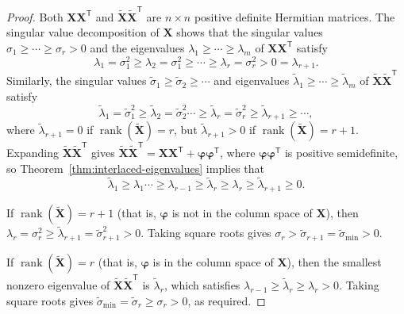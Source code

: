 \documentclass[10pt,a4paper]{amsart}
\DeclareMathOperator{\rank}{rank}
\newcommand{\bbX}{\mathbf{X}}
\newcommand{\bphi}{\boldsymbol{\varphi}}
\newcommand{\trp}{^{\mathsf{T}}}  %
\begin{document}
\begin{proof}
Both $\bbX \bbX\trp$ and $\widetilde{\bbX}\widetilde{\bbX}\trp$ are $n \times n$ positive definite Hermitian matrices.
The singular value decomposition of $\bbX$ shows that the singular values $\sigma_1\ge \cdots \ge \sigma_r >0$ and the eigenvalues $\lambda_1\ge \cdots \ge \lambda_m$ of $\bbX \bbX\trp$ satisfy 
\[
\lambda_1 =\sigma^2_1 \ge \lambda_2 = \sigma^2_1 \ge \cdots \ge \lambda_r = \sigma^2_r > 0 = \lambda_{r+1}.  
\]
Similarly, the singular values $\widetilde{\sigma}_1 \ge \widetilde{\sigma}_2 \ge \cdots$ and eigenvalues $\widetilde{\lambda}_1 \ge \cdots \ge \widetilde{\lambda}_m$ of $\widetilde{\bbX} \widetilde{\bbX}\trp$ satisfy
\[
\widetilde{\lambda}_1 = \widetilde{\sigma}^2_1 \ge \widetilde{\lambda}_2 = \widetilde{\sigma}^2_2 \cdots \ge \widetilde{\lambda}_r = \widetilde{\sigma}^2_r \ge  \widetilde{\lambda}_{r+1} \ge \cdots,
\]
where $\widetilde{\lambda}_{r+1} = 0$ if $\rank(\widetilde{\bbX}) = r$, but $\widetilde{\lambda}_{r+1} > 0$  if $\rank(\widetilde{\bbX}) = r+1$.
Expanding $\widetilde{\bbX}\widetilde{\bbX}\trp$ gives
$\widetilde{\bbX}\widetilde{\bbX}\trp = \bbX \bbX\trp + \bphi\bphi\trp$,
where $\bphi \bphi\trp$ is positive semidefinite, so Theorem~\ref{thm:interlaced-eigenvalues} implies that 
\[
\widetilde{\lambda}_1 \ge \lambda_1 \cdots \ge \lambda_{r-1} \ge \widetilde{\lambda}_r \ge \lambda_r \ge \widetilde{\lambda}_{r+1} \ge 0. 
\]

If $\rank(\widetilde{\bbX}) = r+1$ (that is, $\bphi$ is not in the column space of $\bbX$), then 
$
\lambda_r = \sigma^2_r \ge \widetilde{\lambda}_{r+1} = \widetilde{\sigma}^2_{r+1} >0$.
Taking square roots gives  
$\sigma_r > \widetilde{\sigma}_{r+1} = \widetilde{\sigma}_{\mathrm{min}} > 0$.

If $\rank(\widetilde{\bbX}) = r$ (that is, $\bphi$ is in the column space of $\bbX$), then the smallest nonzero eigenvalue of  $\widetilde{\bbX}\widetilde{\bbX}\trp$ is $\widetilde{\lambda}_r$, which satisfies  
$\lambda_{r-1} \ge \widetilde{\lambda}_r \ge \lambda_r > 0$. 
Taking square roots gives 
$\widetilde{\sigma}_{\mathrm{min}}=\widetilde{\sigma}_{r}  \ge \sigma_r > 0$, as required.
\end{proof}
\end{document}
